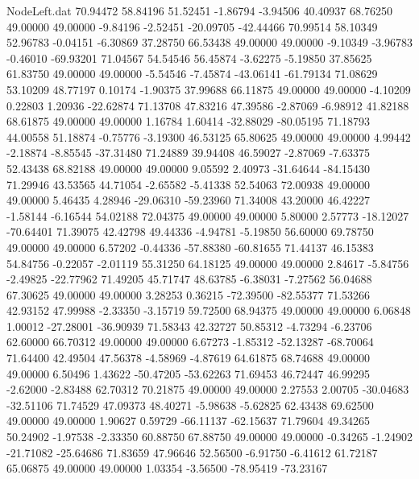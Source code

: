 \begin{filecontents}{NodeLeft.dat}
  70.94472   58.84196   51.52451    -1.86794   -3.94506   40.40937   68.76250   49.00000   49.00000   -9.84196   -2.52451  -20.09705  -42.44466
  70.99514   58.10349   52.96783    -0.04151   -6.30869   37.28750   66.53438   49.00000   49.00000   -9.10349   -3.96783   -0.46010  -69.93201
  71.04567   54.54546   56.45874    -3.62275   -5.19850   37.85625   61.83750   49.00000   49.00000   -5.54546   -7.45874  -43.06141  -61.79134
  71.08629   53.10209   48.77197     0.10174   -1.90375   37.99688   66.11875   49.00000   49.00000   -4.10209    0.22803    1.20936  -22.62874
  71.13708   47.83216   47.39586    -2.87069   -6.98912   41.82188   68.61875   49.00000   49.00000    1.16784    1.60414  -32.88029  -80.05195
  71.18793   44.00558   51.18874    -0.75776   -3.19300   46.53125   65.80625   49.00000   49.00000    4.99442   -2.18874   -8.85545  -37.31480
  71.24889   39.94408   46.59027    -2.87069   -7.63375   52.43438   68.82188   49.00000   49.00000    9.05592    2.40973  -31.64644  -84.15430
  71.29946   43.53565   44.71054    -2.65582   -5.41338   52.54063   72.00938   49.00000   49.00000    5.46435    4.28946  -29.06310  -59.23960
  71.34008   43.20000   46.42227    -1.58144   -6.16544   54.02188   72.04375   49.00000   49.00000    5.80000    2.57773  -18.12027  -70.64401
  71.39075   42.42798   49.44336    -4.94781   -5.19850   56.60000   69.78750   49.00000   49.00000    6.57202   -0.44336  -57.88380  -60.81655
  71.44137   46.15383   54.84756    -0.22057   -2.01119   55.31250   64.18125   49.00000   49.00000    2.84617   -5.84756   -2.49825  -22.77962
  71.49205   45.71747   48.63785    -6.38031   -7.27562   56.04688   67.30625   49.00000   49.00000    3.28253    0.36215  -72.39500  -82.55377
  71.53266   42.93152   47.99988    -2.33350   -3.15719   59.72500   68.94375   49.00000   49.00000    6.06848    1.00012  -27.28001  -36.90939
  71.58343   42.32727   50.85312    -4.73294   -6.23706   62.60000   66.70312   49.00000   49.00000    6.67273   -1.85312  -52.13287  -68.70064
  71.64400   42.49504   47.56378    -4.58969   -4.87619   64.61875   68.74688   49.00000   49.00000    6.50496    1.43622  -50.47205  -53.62263
  71.69453   46.72447   46.99295    -2.62000   -2.83488   62.70312   70.21875   49.00000   49.00000    2.27553    2.00705  -30.04683  -32.51106
  71.74529   47.09373   48.40271    -5.98638   -5.62825   62.43438   69.62500   49.00000   49.00000    1.90627    0.59729  -66.11137  -62.15637
  71.79604   49.34265   50.24902    -1.97538   -2.33350   60.88750   67.88750   49.00000   49.00000   -0.34265   -1.24902  -21.71082  -25.64686
  71.83659   47.96646   52.56500    -6.91750   -6.41612   61.72187   65.06875   49.00000   49.00000    1.03354   -3.56500  -78.95419  -73.23167

\end{filecontents}
